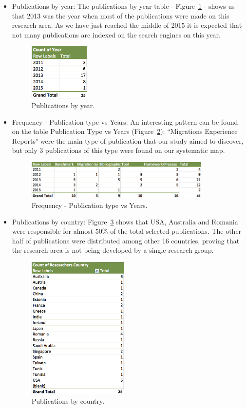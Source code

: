 \documentclass[a4paper]{IEEEtran}
\begin{document}
\begin{itemize}
\item{Publications by year: }
The publications by year table - Figure~\ref{fig:pubByYear} -  shows us that 2013 was the year when most of the publications were made on this research area. As we have just reached  the middle of 2015 it is expected that not many publications are indexed on the search engines on this year.
\begin{figure}[htb!]
\centering
\includegraphics[width=30mm]{graph2.png}
\caption{Publications by year.\label{fig:pubByYear}}
\end{figure}



\item {Frequency - Publication type vs Years: }
An interesting pattern can be found on the table Publication Type vs Years (Figure~\ref{fig:pubTypeVsYears}); ``Migrations Experience Reports" were the main type of publication that our study aimed to discover, but only 3 publications of this type were found on our systematic map. 

\begin{figure}[htb!]
\centering
\includegraphics[width=92mm]{graph1.png}
\caption{Frequency - Publication type vs Years.\label{fig:pubTypeVsYears}}
\end{figure}


\item{Publications by country: }
Figure~\ref{fig:pubVsCountry} shows that USA, Australia and Romania were responsible for almost 50\% of the total selected publications. The other half of publications were distributed among other 16 countries, proving that the research area is not being developed by a single research group. 
\begin{figure}[htb!]
\centering
\includegraphics[width=50mm]{graph3.png}
\caption{Publications by country. \label{fig:pubVsCountry}}
\end{figure}




\end{itemize}
\end{document}
